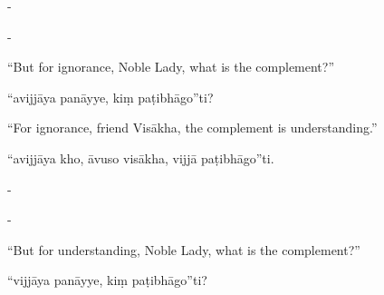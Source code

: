 \begin{samepage}
\begin{leftcolumn*}
-
\end{leftcolumn*}

\begin{rightcolumn}
-
\end{rightcolumn}
\end{samepage}

\begin{samepage}
\begin{leftcolumn*}
“But for ignorance, Noble Lady, what is the complement?”
\end{leftcolumn*}

\begin{rightcolumn}
“avijjāya panāyye, kiṃ paṭibhāgo”ti?
\end{rightcolumn}
\end{samepage}

\begin{samepage}
\begin{leftcolumn*}
“For ignorance, friend Visākha, the complement is understanding.”
\end{leftcolumn*}

\begin{rightcolumn}
“avijjāya kho, āvuso visākha, vijjā paṭibhāgo”ti.
\end{rightcolumn}
\end{samepage}

\begin{samepage}
\begin{leftcolumn*}
-
\end{leftcolumn*}

\begin{rightcolumn}
-
\end{rightcolumn}
\end{samepage}

\begin{samepage}
\begin{leftcolumn*}
“But for understanding, Noble Lady, what is the complement?”
\end{leftcolumn*}

\begin{rightcolumn}
“vijjāya panāyye, kiṃ paṭibhāgo”ti?
\end{rightcolumn}
\end{samepage}

